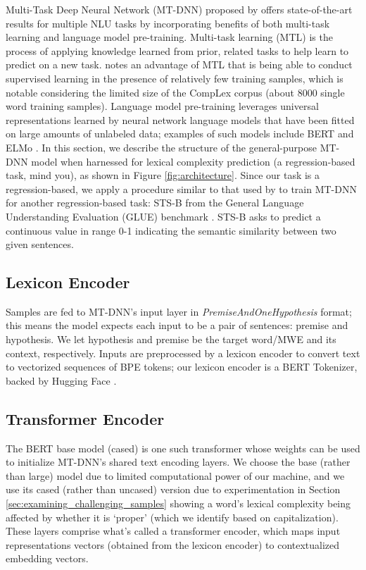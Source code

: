 \documentclass{dcthesis}
\theoremstyle{definition}
\theoremstyle{remark}
\begin{document}
Multi-Task Deep Neural Network (MT-DNN) proposed by \citet{liu2019multi} offers state-of-the-art results for multiple NLU tasks by incorporating benefits of both multi-task learning and language model pre-training. Multi-task learning (MTL) is the process of applying knowledge learned from prior, related tasks to help learn to predict on a new task. \citet{liu2019multi} notes an advantage of MTL that is being able to conduct supervised learning in the presence of relatively few training samples, which is notable considering the limited size of the CompLex corpus (about 8000 single word training samples). Language model pre-training leverages universal representations learned by neural network language models that have been fitted on large amounts of unlabeled data; examples of such models include BERT \citep{devlin2018bert} and ELMo \citep{peters2018deep}. In this section, we describe the structure of the general-purpose MT-DNN model when harnessed for lexical complexity prediction (a regression-based task, mind you), as shown in Figure \ref{fig:architecture}. Since our task is a regression-based, we apply a procedure similar to that used by \citet{liu2019multi} to train MT-DNN for another regression-based task: STS-B from the General Language Understanding Evaluation (GLUE) benchmark \citep{wang2018glue}. STS-B asks to predict a continuous value in range 0-1 indicating the semantic similarity between two given sentences.

\subsection{Lexicon Encoder}

Samples are fed to MT-DNN's input layer in \textit{PremiseAndOneHypothesis} format; this means the model expects each input to be a pair of sentences: premise and hypothesis. We let hypothesis and premise be the target word/MWE and its context, respectively. Inputs are preprocessed by a lexicon encoder to convert text to vectorized sequences of BPE tokens; our lexicon encoder is a BERT Tokenizer, backed by Hugging Face \citep{wolf2020transformers}.

\subsection{Transformer Encoder}

The BERT base model (cased) is one such transformer whose weights can be used to initialize MT-DNN's shared text encoding layers. We choose the base (rather than large) model due to limited computational power of our machine, and we use its cased (rather than uncased) version due to experimentation in Section \ref{sec:examining_challenging_samples} showing a word's lexical complexity being affected by whether it is `proper' (which we identify based on capitalization). These layers comprise what's called a transformer encoder, which maps input representations vectors (obtained from the lexicon encoder) to contextualized embedding vectors.
\end{document}
